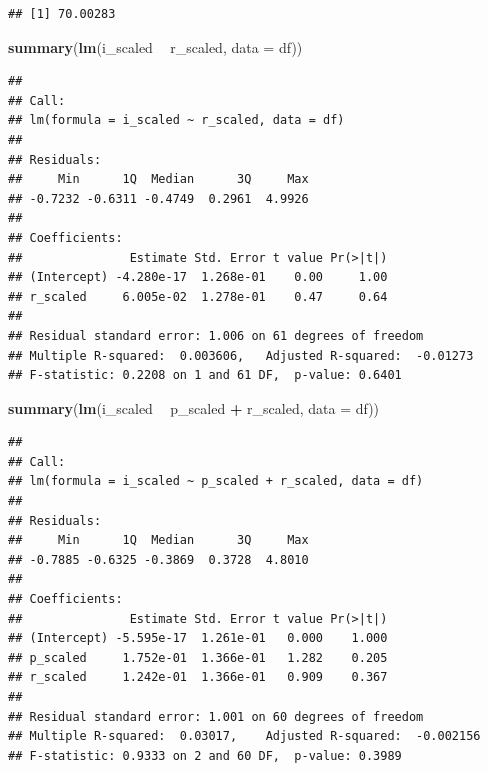 \documentclass[11pt,]{book}
\newenvironment{Shaded}{\begin{snugshade}}{\end{snugshade}}
\newcommand{\DataTypeTok}[1]{\textcolor[rgb]{0.13,0.29,0.53}{#1}}
\newcommand{\KeywordTok}[1]{\textcolor[rgb]{0.13,0.29,0.53}{\textbf{#1}}}
\newcommand{\NormalTok}[1]{#1}
\newcommand{\OperatorTok}[1]{\textcolor[rgb]{0.81,0.36,0.00}{\textbf{#1}}}
\newcommand{\StringTok}[1]{\textcolor[rgb]{0.31,0.60,0.02}{#1}}
\begin{document}
\begin{Shaded}
\end{Shaded}

\begin{verbatim}
## [1] 70.00283
\end{verbatim}

\begin{Shaded}
\begin{Highlighting}[]
\KeywordTok{summary}\NormalTok{(}\KeywordTok{lm}\NormalTok{(i_scaled }\OperatorTok{~}\StringTok{ }\NormalTok{r_scaled, }\DataTypeTok{data =}\NormalTok{ df))}
\end{Highlighting}
\end{Shaded}

\begin{verbatim}
## 
## Call:
## lm(formula = i_scaled ~ r_scaled, data = df)
## 
## Residuals:
##     Min      1Q  Median      3Q     Max 
## -0.7232 -0.6311 -0.4749  0.2961  4.9926 
## 
## Coefficients:
##               Estimate Std. Error t value Pr(>|t|)
## (Intercept) -4.280e-17  1.268e-01    0.00     1.00
## r_scaled     6.005e-02  1.278e-01    0.47     0.64
## 
## Residual standard error: 1.006 on 61 degrees of freedom
## Multiple R-squared:  0.003606,   Adjusted R-squared:  -0.01273 
## F-statistic: 0.2208 on 1 and 61 DF,  p-value: 0.6401
\end{verbatim}

\begin{Shaded}
\begin{Highlighting}[]
\KeywordTok{summary}\NormalTok{(}\KeywordTok{lm}\NormalTok{(i_scaled }\OperatorTok{~}\StringTok{ }\NormalTok{p_scaled }\OperatorTok{+}\StringTok{ }\NormalTok{r_scaled, }\DataTypeTok{data =}\NormalTok{ df))}
\end{Highlighting}
\end{Shaded}

\begin{verbatim}
## 
## Call:
## lm(formula = i_scaled ~ p_scaled + r_scaled, data = df)
## 
## Residuals:
##     Min      1Q  Median      3Q     Max 
## -0.7885 -0.6325 -0.3869  0.3728  4.8010 
## 
## Coefficients:
##               Estimate Std. Error t value Pr(>|t|)
## (Intercept) -5.595e-17  1.261e-01   0.000    1.000
## p_scaled     1.752e-01  1.366e-01   1.282    0.205
## r_scaled     1.242e-01  1.366e-01   0.909    0.367
## 
## Residual standard error: 1.001 on 60 degrees of freedom
## Multiple R-squared:  0.03017,    Adjusted R-squared:  -0.002156 
## F-statistic: 0.9333 on 2 and 60 DF,  p-value: 0.3989
\end{verbatim}
\end{document}
